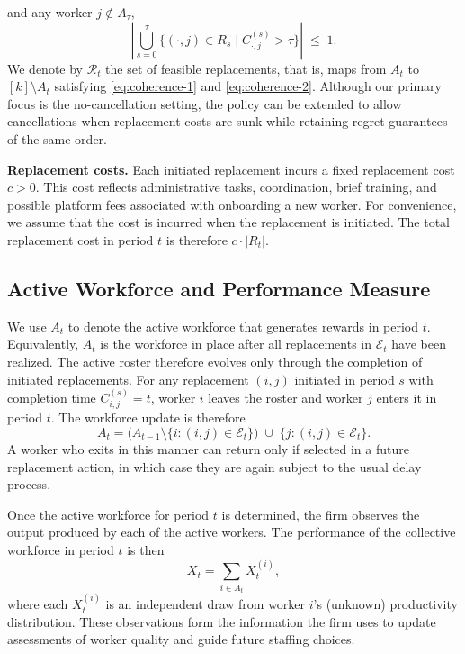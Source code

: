 \documentclass[opre,blindrev]{informs3}
\begin{document}
and any worker \(j \notin A_\tau\),
\begin{equation}\label{eq:coherence-2}
    \left|\bigcup_{s=0}^{\tau}\{(\cdot,j)\in R_s \mid C_{\cdot,j}^{(s)}>\tau\}\right|
    \;\leq\; 1.
\end{equation}
We denote by \(\mathcal{R}_t\) the set of feasible replacements, that is, maps from \(A_t\) to \([k]\setminus A_t\) satisfying \eqref{eq:coherence-1} and \eqref{eq:coherence-2}. Although our primary focus is the no-cancellation setting, the policy can be extended to allow cancellations when replacement costs are sunk while retaining regret guarantees of the same order.

{\bf Replacement costs.} Each initiated replacement incurs a fixed replacement cost \(c > 0\). This cost reflects administrative tasks, coordination, brief training, and possible platform fees associated with onboarding a new worker. For convenience, we assume that the cost is incurred when the replacement is initiated. The total replacement cost in period \(t\) is therefore \(c \cdot |R_t|\).

\vspace{-.1in}

\subsection{Active Workforce and Performance Measure}
We use \(A_t\) to denote the active workforce that generates rewards in period \(t\). Equivalently, \(A_t\) is the workforce in place after all replacements in \(\mathcal{E}_t\) have been realized. The active roster therefore evolves only through the completion of initiated replacements. For any replacement \((i,j)\) initiated in period \(s\) with completion time \(C_{i,j}^{(s)} = t\), worker \(i\) leaves the roster and worker \(j\) enters it in period \(t\). The workforce update is therefore
\[
    A_t
    = \big( A_{t-1} \setminus \{  i : (i,j) \in \mathcal{E}_t  \} \big)
      \;\cup\;
      \{  j : (i,j) \in \mathcal{E}_t  \}.
\]
A worker who exits in this manner can return only if selected in a future replacement action, in which case they are again subject to the usual delay process.

Once the active workforce for period \(t\) is determined, the firm observes the output produced by each of the active workers. The performance of the collective workforce in period \(t\) is then
\[
    X_t = \sum_{i \in A_t} X_t^{(i)},
\]
where each \(X_t^{(i)}\) is an independent draw from worker \(i\)'s (unknown) productivity distribution. These observations form the information the firm uses to update assessments of worker quality and guide future staffing choices.
\end{document}
